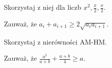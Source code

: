 

\begin{hints_list}
	\item Skorzystaj z niej dla liczb $x^2, \frac{x}{2}, \frac{x}{2}$.
	\item Zauważ, że $a_i + a_{i + 1} \geqslant 2\sqrt{a_ia_{i + 1}}$.
	\item Skorzystaj z nierówności AM-HM.
	\item *
	\item Zauważ, że $\frac{a^2}{a + b} + \frac{a + b}{4} \geqslant a$.
\end{hints_list}